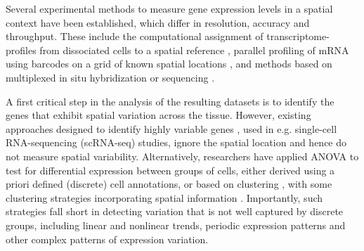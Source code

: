 Several experimental methods to measure gene expression levels in a spatial context have been established, which differ in resolution, accuracy and throughput. These include the computational assignment of transcriptome-profiles from dissociated cells to a spatial reference \cite{Achim2015-fe, Satija2015-lz}, parallel profiling of mRNA using barcodes on a grid of known spatial locations \cite{Junker2014-do, Chen2017-lg, Stahl2016-ym}, and methods based on multiplexed in situ hybridization \cite{Shah2016-bi, Moffitt2016-bi} or sequencing \cite{Ke2013-ek, Lee2014-ix, Lee2015-sz}.

A first critical step in the analysis of the resulting datasets is to identify the genes that exhibit spatial variation across the tissue. However, existing approaches designed to identify highly variable genes \cite{Brennecke2013-vv, Vallejos2015-fh}, used in e.g. single-cell RNA-sequencing (scRNA-seq) studies, ignore the spatial location and hence do not measure spatial variability. Alternatively, researchers have applied ANOVA to test for differential expression between groups of cells, either derived using a priori defined (discrete) cell annotations, or based on clustering \cite{Achim2015-fe, Satija2015-lz, Stahl2016-ym, Shah2016-bi, Ke2013-ek}, with some clustering strategies incorporating spatial information \cite{Pettit2014-pa}. Importantly, such strategies fall short in detecting variation that is not well captured by discrete groups, including linear and nonlinear trends, periodic expression patterns and other complex patterns of expression variation. 

